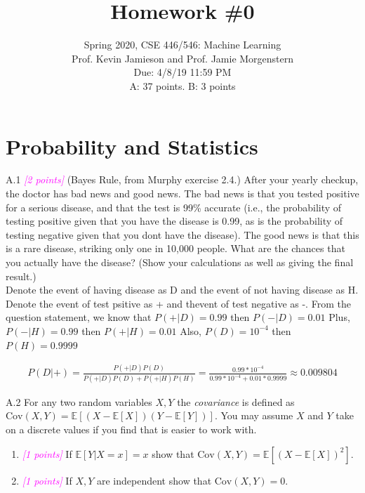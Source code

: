 \documentclass{article}
\date{{}}
\newcommand{\1}{\mathbf{1}}
\newcommand{\E}{\mathbb{E}}
\newcommand{\points}[1]{\small\textcolor{magenta}{\emph{[#1 points]}} \normalsize}
\begin{document}
\title{Homework \#0}
\author{\normalsize{Spring 2020, CSE 446/546: Machine Learning}\\
\normalsize{Prof. Kevin Jamieson and Prof. Jamie Morgenstern} \\
\normalsize{Due: 4/8/19  11:59 PM}\\
\normalsize{A: 37 points. B: 3 points}}
\maketitle


\section*{Probability and Statistics}
A.1 \points{2} (Bayes Rule, from Murphy exercise 2.4.) After your yearly checkup, the doctor has bad news and good news. The bad news is that you tested positive for a serious disease, and that the test is 99\% accurate (i.e., the probability of testing positive given that you have the disease is 0.99, as is the probability of testing negative given that you dont have the disease). The good news is that this is a rare disease, striking only one in 10,000 people. What are the chances that you actually have the disease? (Show your calculations as well as giving the final result.)\\

Denote the event of having disease as D and the event of not having disease as H.
Denote the event of test psitive as + and thevent of test negative as -.  
From the question statement, we know that $P(+|D)=0.99$ then $P(-|D)=0.01$
Plus,  $P(-|H)= 0.99 $ then $P(+|H)=0.01$
	Also, $P(D)=10^{-4}$ then $P(H) =0.9999  $

\begin{eqnarray*}
		P(D|+) = \frac{P(+|D)P(D)}{P(+|D)P(D) +P(+|H)P(H)}  = \frac{0.99*10^{-4}}{0.99*10^{-4} + 0.01*0.9999} \approx  0.009804
\end{eqnarray*}

\vspace{2cm}

A.2 For any two random variables $X,Y$ the \emph{covariance} is
  defined as
  $\text{Cov}(X,Y)=\E[(X-\E[X])(Y-\E[Y])]$. You may assume $X$ and $Y$
  take on a discrete values if you find that is easier to work with.
\begin{enumerate}
\item \points{1} If $\E[Y|X=x] = x$ show that $\text{Cov}(X,Y) = \E[(X-\E[X])^2]$.  

\item \points{1} If $X,Y$ are independent show that $\text{Cov}(X,Y)=0$.
\end{enumerate}
\end{document}
